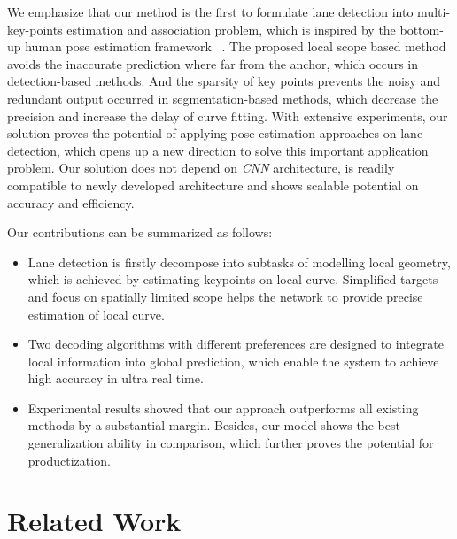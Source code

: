 \documentclass[final]{cvpr}
\begin{document}
We emphasize that our method is the first to formulate lane detection into multi-key-points estimation and association problem, which is inspired by the bottom-up human pose estimation framework ~\cite{pishchulin2016deepcut, cao2017realtime, efrat2020semi}. The proposed local scope based method avoids the inaccurate prediction where far from the anchor, which occurs in detection-based methods. And the sparsity of key points prevents the noisy and redundant output occurred in segmentation-based methods, which decrease the precision and increase the delay of curve fitting. With extensive experiments, our solution proves the potential of applying pose estimation approaches on lane detection, which opens up a new direction to solve this important application problem. Our solution does not depend on \textit{CNN} architecture, is readily compatible to newly developed architecture and shows scalable potential on accuracy and efficiency. 

Our contributions can be summarized as follows:
\begin{itemize}
	\item Lane detection is firstly decompose into subtasks of modelling local geometry, which is achieved by estimating keypoints on local curve. Simplified targets and focus on spatially limited scope helps the network to provide precise estimation of local curve.
	
	\item Two decoding algorithms with different preferences are designed to integrate local information into global prediction, which enable the system to achieve high accuracy in ultra real time.
	
	\item Experimental results showed that our approach outperforms all existing methods by a substantial margin. Besides, our model shows the best generalization ability in comparison, which further proves the potential for productization.
\end{itemize}


\thispagestyle{empty}
\section{Related Work}
\end{document}
